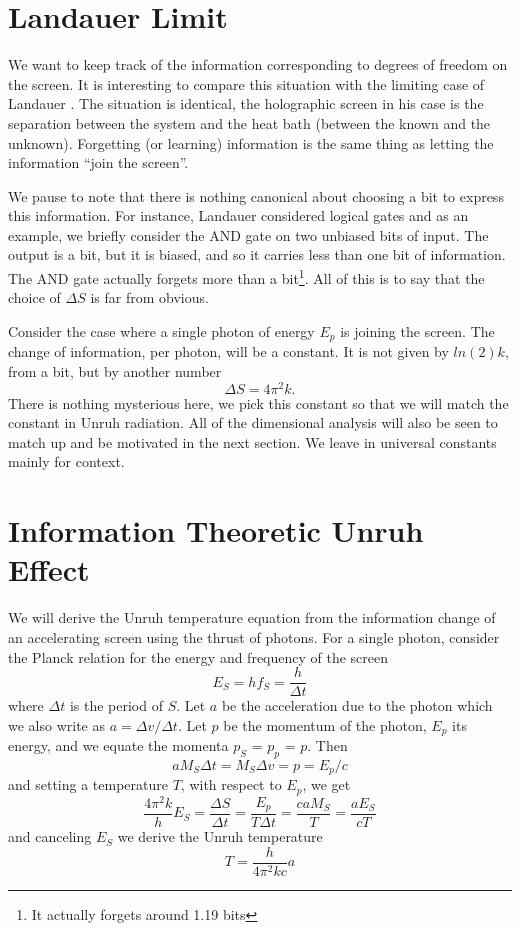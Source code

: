 \documentclass[12pt,a4paper]{article}
\begin{document}
\section{Landauer Limit}
We want to keep track of the information corresponding to degrees of freedom on the screen. It is interesting to compare this situation with the limiting case of Landauer \cite{landauer}.  The situation is identical, the holographic screen in his case is the separation between the system and the heat bath (between the known and the unknown).  Forgetting (or learning) information is the same thing as letting the information ``join the screen''.

We pause to note that there is nothing canonical about choosing a bit to express this information.  For instance, Landauer considered logical gates and as an example, we briefly consider the AND gate on two unbiased bits of input.  The output is a bit, but it is biased, and so it carries less than one bit of information.  The AND gate actually forgets more than a bit\footnote{It actually forgets around 1.19 bits}.  All of this is to say that the choice of $\Delta S$ is far from obvious.

Consider the case where a single photon of energy $E_p$ is joining the screen.  The change of information, per photon, will be a constant.  It is not given by $ln(2)k$, from a bit, but by another number
\[
  \Delta S = 4 \pi ^ 2 k.
\]
There is nothing mysterious here, we pick this constant so that we will match the constant in Unruh radiation. All of the dimensional analysis will also be seen to match up and be motivated in the next section.  We leave in universal constants mainly for context.

\section{Information Theoretic Unruh Effect}

We will derive the Unruh temperature equation from the information change of an accelerating screen using the thrust of photons. For a single photon, consider the Planck relation for the energy and frequency of the screen
\[
  E_S = h f_S = \frac{h}{\Delta t}
\]
where $\Delta t$ is the period of $S$. Let $a$ be the acceleration due to the photon which we also write as $a = \Delta v / \Delta t$.  Let $p$ be the momentum of the photon, $E_p$ its energy, and we equate the momenta $p_S$ = $p_p$ = $p$.  Then
\[
  a M_S \Delta t = M_S  \Delta v = p = E_p / c
  \]
and setting a temperature $T$, with respect to $E_p$, we get
\[
  \frac{4 \pi^2 k}{h} E_S = \frac{\Delta S}{\Delta t} = \frac{E_p}{T \Delta t} = \frac{ca M_S}{T} = \frac{aE_S}{cT}
\]
and canceling $E_S$ we derive the Unruh temperature \cite{unruh}
\[
T = \frac{h}{4\pi^2k c} a
\]
\end{document}
